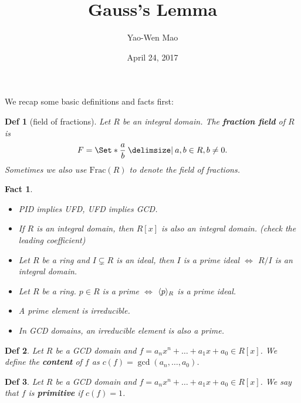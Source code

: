 \documentclass[a4paper]{article}
\title{Gauss's Lemma}
\author{Yao-Wen Mao}
\date{April 24, 2017}
\DeclarePairedDelimiter{\gen}{\langle}{\rangle} %
\newcommand*\quot[2]{{#1}/{#2}}
\providecommand\given{}
\newcommand*\SetSymbol[1][]{%
  \nonscript\:#1\vert
  \allowbreak
  \nonscript\:
\mathopen{}}
\renewcommand\given{\SetSymbol[\delimsize]}
\renewcommand\given{\SetSymbol[\delimsize]}
\theoremstyle{mystyle}
\newtheorem{definition}{Def}
\newtheorem{fact}{Fact}
\begin{document}
\maketitle
We recap some basic definitions and facts first:

\begin{definition}[field of fractions]
  Let $R$ be an integral domain. The {\bf fraction field} of $R$
  is \[ F = \Set*{\frac{a}{b} \given a, b \in R, b \ne 0}. \]
  Sometimes we also use $\text{Frac}(R)$ to denote the field of fractions.
\end{definition}

\begin{fact} \mbox{}
  \begin{itemize}
    \item PID implies UFD, UFD implies GCD.
    \item If $R$ is an integral domain, then $R[x]$ is also an integral domain.
      (check the leading coefficient)
    \item Let $R$ be a ring and $I \subsetneq R$ is an ideal, then
      $I$ is a prime ideal $\iff$ $\quot{R}{I}$ is an integral domain.
    \item Let $R$ be a ring. $p \in R$ is a prime $\iff$
      $\gen{p}_R$ is a prime ideal.
    \item A prime element is irreducible.
    \item In GCD domains, an irreducible element is also a prime.
  \end{itemize}
\end{fact}

\begin{definition}
  Let $R$ be a GCD domain and $f = a_nx^n + \dots + a_1x + a_0 \in R[x]$.
  We define the {\bf content} of $f$ as $c(f) = \gcd(a_n, \dots, a_0)$.
\end{definition}

\begin{definition}
  Let $R$ be a GCD domain and $f = a_nx^n + \dots + a_1x + a_0 \in R[x]$.
  We say that $f$ is {\bf primitive} if $c(f) = 1$.
\end{definition}
\end{document}
